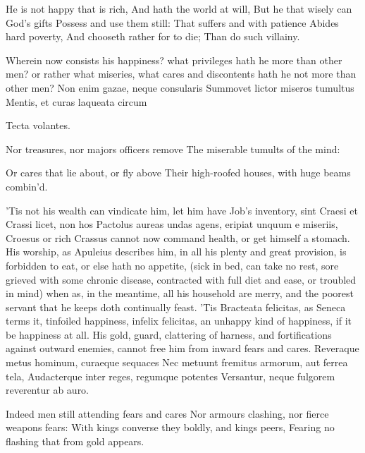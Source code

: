 {He is not happy that is rich,
And hath the world at will,
But he that wisely can God's gifts
Possess and use them still:
That suffers and with patience
Abides hard poverty,
And chooseth rather for to die;
Than do such villainy.

Wherein now consists his happiness? what privileges hath he more than
other men? or rather what miseries, what cares and discontents hath he
not more than other men?
Non enim gazae, neque consularis
Summovet lictor miseros tumultus
Mentis, et curas laqueata circum

Tecta volantes.


Nor treasures, nor majors officers remove
The miserable tumults of the mind:

Or cares that lie about, or fly above
Their high-roofed houses, with huge beams combin'd.

'Tis not his wealth can vindicate him, let him have Job's inventory,
sint Craesi et Crassi licet, non hos Pactolus aureas undas agens,
eripiat unquum e miseriis, Croesus or rich Crassus cannot now command
health, or get himself a stomach. His worship, as Apuleius
describes him, in all his plenty and great provision, is forbidden to
eat, or else hath no appetite, (sick in bed, can take no rest, sore
grieved with some chronic disease, contracted with full diet and ease,
or troubled in mind) when as, in the meantime, all his household are
merry, and the poorest servant that he keeps doth continually feast.
'Tis Bracteata felicitas, as  Seneca terms it, tinfoiled
happiness, infelix felicitas, an unhappy kind of happiness, if it be
happiness at all. His gold, guard, clattering of harness, and
fortifications against outward enemies, cannot free him from inward
fears and cares.
Reveraque metus hominum, curaeque sequaces
Nec metuunt fremitus armorum, aut ferrea tela,
Audacterque inter reges, regumque potentes
Versantur, neque fulgorem reverentur ab auro.

Indeed men still attending fears and cares
Nor armours clashing, nor fierce weapons fears:
With kings converse they boldly, and kings peers,
Fearing no flashing that from gold appears.

}
